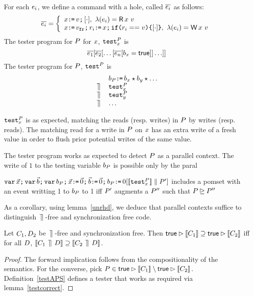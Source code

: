 \begin{definition}
For each $e_i$, we define a command with a hole, called $\overline{e_i}$ as follows:
\[
\test{\aEv_i} = \left\{ 
                             \begin{array}{l}
                              \aLoc\GETS\aVal \SEMI \hole{\cdot}, \ \labeling(\aEv_i) = \DR{\aLoc}{\aVal} \\
                              \aLoc\GETS\freshaval\SEMI \aReg_i \GETS\aLoc \SEMI \IF{\aReg_i == \aVal} \THEN \hole{\cdot} \FI , \ \labeling(\aEv_i) = \DW{\aLoc}{\aVal} \\
                           \end{array}
                       \right.
\]    
The tester program for $P$ for $x$, ${\tt test}^{P}_{x}$ is \[ \overline{e_1}[\overline{e_2}[\ldots [\overline{e_n}[b_{x} = \mathsf{true}]]\ldots]] \]
The tester program for $P$, ${\tt test}^{P}_{}$ is 
\[
\begin{array}{ll}
& b_{P}\texttt{:}\mkern-1mu\texttt{=}\, b_{x} \star b_{y} \star  \ldots   \\
\,\mathbin{\rrceil}\, & {\tt test}^{P}_{x} \\
\,\mathbin{\rrceil}\, & {\tt test}^{P}_{y} \\
 \,\mathbin{\rrceil}\,  & \ldots 
\end{array}
\]
\end{definition}
 ${\tt test}^{P}_{x}$ is as expected, matching the reads (resp. writes) in $P$ by writes (resp. reads).  The matching read for a write in $P$ on $x$ has an extra write of a fresh value in order to flush prior potential writes of the same value.    

The tester program works as expected to detect $P$ as a parallel context.  
The write of $1$ to the testing variable $b_{P}$ is possible only by the paral
\begin{lemma}\label{testcorrect}
$\texttt{var}\,\vec{x}\texttt{;}\, \texttt{var}\,\vec{b} \texttt{;}\, \texttt{var}\, b_{P} \texttt{;}\,
    \vec{x}\texttt{:}\mkern-1mu\texttt{=}\,\vec{0}\texttt{;}\,
    \vec{b}\texttt{:}\mkern-1mu\texttt{=}\,\vec{0} \texttt{;}\, b_{P}\texttt{:}\mkern-1mu\texttt{=}\, 0 [\llbracket{\tt test}^{P}_{x}\rrbracket \parallel P']$
includes a pomset with an event writting 1 to $b_{P}$ to 1 iff $P'$ augments a $P''$ such that $P \unrhd P''$
\end{lemma}
As a corollary, using lemma~\ref{unrhd}, we deduce that parallel contexts suffice to distinguish  $\,\mathbin{\rrceil}\,$-free and synchronization free code.
\begin{theorem}
Let $C_1, D_2$ be $\,\mathbin{\rrceil}\,$-free and synchronization free.  Then $\mathsf{true}\mathbin\rhd \llbracket C_1\rrbracket  \supseteq \mathsf{true}\mathbin\rhd \llbracket C_2\rrbracket$ iff for all $D$,  $\llbracket C_1\,\mathbin{\rrceil}\, D\rrbracket  \supseteq \llbracket C_2 \,\mathbin{\rrceil}\, D\rrbracket$.
\end{theorem}
\begin{proof}
The forward implication follows from the compositionality of the semantics. For the converse, pick $P \in \mathsf{true}\mathbin\rhd \llbracket C_1\rrbracket \setminus \mathsf{true}\mathbin\rhd \llbracket C_2\rrbracket $.  Definition~\ref{testAPS} defines a tester that works as required via lemma~\ref{testcorrect}.
\end{proof}

\endinput 



